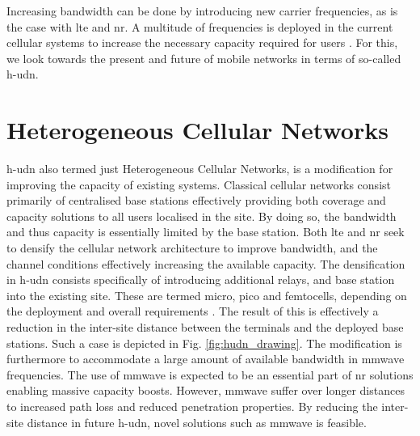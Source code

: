 Increasing bandwidth can be done by introducing new carrier frequencies, as is the case with \gls{lte} and \gls{nr}. A multitude of frequencies is deployed in the current cellular systems to increase the necessary capacity required for users \cite{Goldsmith2005WirelessCommunications, Molisch2007, Mogensen2007}. For this, we look towards the present and future of mobile networks in terms of so-called \gls{h-udn}.



\section{Heterogeneous Cellular Networks}
\gls{h-udn} also termed just Heterogeneous Cellular Networks, is a modification for improving the capacity of existing systems. Classical cellular networks consist primarily of centralised base stations effectively providing both coverage and capacity solutions to all users localised in the site. By doing so, the bandwidth and thus capacity is essentially limited by the base station. Both \gls{lte} and \gls{nr} seek to densify the cellular network architecture to improve bandwidth, and the channel conditions effectively increasing the available capacity. The densification in \gls{h-udn} consists specifically of introducing additional relays, and base station into the existing site. These are termed micro, pico and femtocells, depending on the deployment and overall requirements \cite{Yunas2015, Ge2016}. The result of this is effectively a reduction in the inter-site distance between the terminals and the deployed base stations. Such a case is depicted in Fig. \ref{fig:hudn_drawing}. The modification is furthermore to accommodate a large amount of available bandwidth in \gls{mmwave} frequencies. The use of \gls{mmwave} is expected to be an essential part of \gls{nr} solutions enabling massive capacity boosts. However, \gls{mmwave} suffer over longer distances to increased path loss and reduced penetration properties. By reducing the inter-site distance in future \gls{h-udn}, novel solutions such as \gls{mmwave} is feasible. 

